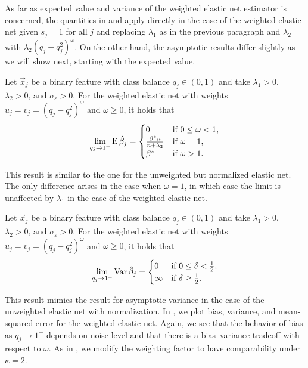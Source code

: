 As far as expected value and variance of the weighted elastic net estimator is concerned,
the quantities in  and  apply
directly in the case of the weighted elastic net given \(s_j = 1\) for all \(j\) and
replacing \(\lambda_1\) as in the previous paragraph and \(\lambda_2\) with \(\lambda_2
(q_j - q_j^2)^\omega\). On the other hand, the asymptotic results differ slightly as we
will show next, starting with the expected value.

\begin{theorem}
  \label{thm:weighted-elasticnet-bias}
  Let \(\vec{x}_j\) be a binary feature with class balance \(q_j \in (0, 1)\) and take
  \(\lambda_1 > 0\), \(\lambda_2 > 0\), and \(\sigma_\varepsilon > 0\). For the
  weighted elastic net with weights \(u_j = v_j = (q_j-q_j^2)^\omega\) and \(\omega \geq 0\), it holds that
  \[
    \lim_{q_j \rightarrow 1^+} \operatorname{E} \hat{\beta}_j =
    \begin{cases}
      0                              & \text{if } 0 \leq \omega < 1, \\
      \frac{\beta^*n}{n + \lambda_2} & \text{if } \omega = 1,        \\
      \beta^*                        & \text{if } \omega > 1.
    \end{cases}
  \]
\end{theorem}

This result is similar to the one for the unweighted but normalized elastic net. The only
difference arises in the case when \(\omega = 1\), in which case the limit is unaffected by
\(\lambda_1\) in the case of the weighted elastic net.

\begin{theorem}
  \label{thm:weighted-elasticnet-variance}
  Let \(\vec{x}_j\) be a binary feature with class balance \(q_j \in (0, 1)\) and take
  \(\lambda_1 > 0\), \(\lambda_2 > 0\), and \(\sigma_\varepsilon > 0\). For the
  weighted elastic net with weights \(u_j = v_j = (q_j-q_j^2)^\omega\) and \(\omega \geq 0\), it holds that
  \[
    \lim_{q_j \rightarrow 1^+} \operatorname{Var} \hat{\beta}_j =
    \begin{cases}
      0      & \text{if } 0 \leq \delta < \frac{1}{2}, \\
      \infty & \text{if } \delta \geq \frac{1}{2}.
    \end{cases}
  \]
\end{theorem}

This result mimics the result for asymptotic variance in the case of the unweighted elastic
net with normalization. In , we plot bias, variance,
and mean-squared error for the weighted elastic net. Again, we see that the behavior of
bias as \(q_j \rightarrow 1^+\) depends on noise level and that there is a bias--variance
tradeoff with respect to \(\omega\). As in , we modify the weighting
factor to have comparability under \(\kappa = 2\).

